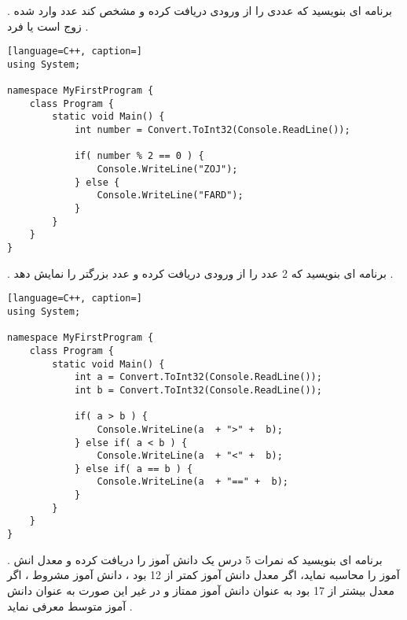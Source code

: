 \documentclass[12pt]{article}
\begin{document}
\newpage

 . برنامه ای بنویسید که عددی را از ورودی دریافت کرده و مشخص کند عدد وارد شده زوج است یا فرد .






\begin{latin}
\begin{lstlisting}[language=C++, caption=]
using System;

namespace MyFirstProgram {
	class Program {
		static void Main() {
			int number = Convert.ToInt32(Console.ReadLine());
	
			if( number % 2 == 0 ) {
				Console.WriteLine("ZOJ");
			} else {
				Console.WriteLine("FARD");
			}
		}
	}
}
\end{lstlisting}
\end{latin}







\newpage

 . برنامه ای بنویسید که 2 عدد را از ورودی دریافت کرده و عدد بزرگتر را نمایش دهد .




\begin{latin}
\begin{lstlisting}[language=C++, caption=]
using System;

namespace MyFirstProgram {
	class Program {
		static void Main() {
			int a = Convert.ToInt32(Console.ReadLine());
			int b = Convert.ToInt32(Console.ReadLine());
	
			if( a > b ) {
				Console.WriteLine(a  + ">" +  b);
			} else if( a < b ) {
				Console.WriteLine(a  + "<" +  b);
			} else if( a == b ) {
				Console.WriteLine(a  + "==" +  b);
			}
		}
	}
}
\end{lstlisting}
\end{latin}






\newpage

 . برنامه ای بنویسید که نمرات 5 درس یک دانش آموز را دریافت کرده و معدل انش آموز را محاسبه نماید، اگر معدل دانش آموز کمتر از 12 بود ، دانش آموز مشروط ، اگر معدل بیشتر از 17 بود به عنوان دانش آموز ممتاز و در غیر این صورت به عنوان دانش آموز متوسط معرفی نماید .
\end{document}
